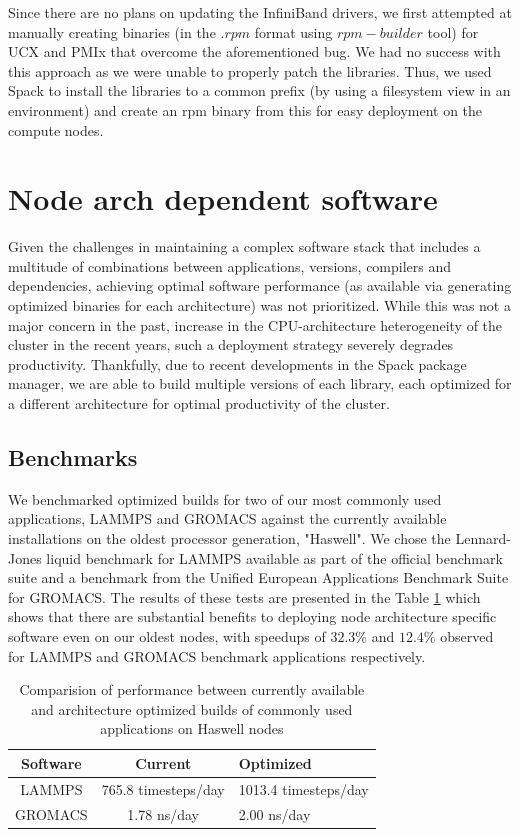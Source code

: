 \documentclass[manuscript,screen]{acmart}
\begin{document}
Since there are no plans on updating the InfiniBand drivers, we first attempted at manually creating binaries (in the $.rpm$ format using $rpm-builder$ tool) for UCX and PMIx that overcome the aforementioned bug. We had no success with this approach as we were unable to properly patch the libraries. Thus, we used Spack \cite{spack} to install the libraries to a common prefix (by using a filesystem view in an environment) and create an rpm binary from this for easy deployment on the compute nodes.

\section{Node arch dependent software}

Given the challenges in maintaining a complex software stack that includes a multitude of combinations between applications, versions, compilers and dependencies, achieving optimal software performance (as available via generating optimized binaries for each architecture) was not prioritized. While this was not a major concern in the past, increase in the CPU-architecture heterogeneity of the cluster in the recent years, such a deployment strategy severely degrades productivity. Thankfully, due to recent developments in the Spack package manager, we are able to build multiple versions of each library, each optimized for a different architecture for optimal productivity of the cluster. 

\subsection{Benchmarks}
We benchmarked optimized builds for two of our most commonly used applications, LAMMPS\cite{lammps} and GROMACS \cite{gromacs_1995,gromacs_2015} against the currently available installations on the oldest processor generation, "Haswell". We chose the Lennard-Jones liquid benchmark for LAMMPS available as part of the official benchmark suite \cite{lammps_bench} and a benchmark from the Unified European Applications Benchmark Suite \cite{ueabs_prace,ueabs_repo} for GROMACS. The results of these tests are presented in the Table \ref{tab:bench_apps} which shows that there are substantial benefits to deploying node architecture specific software even on our oldest nodes, with speedups of $32.3\%$ and $12.4\%$ observed for LAMMPS and GROMACS benchmark applications respectively.

\begin{table}
	\caption{Comparision of performance between currently available and architecture optimized builds of commonly used applications on Haswell nodes}
	\label{tab:bench_apps}
	\begin{tabular}{ccl}
		\toprule
		Software &Current&Optimized\\
		\midrule
		LAMMPS & 765.8 timesteps/day&1013.4 timesteps/day\\
		GROMACS & 1.78 ns/day&2.00 ns/day\\
		\bottomrule
	\end{tabular}
\end{table}
\end{document}
